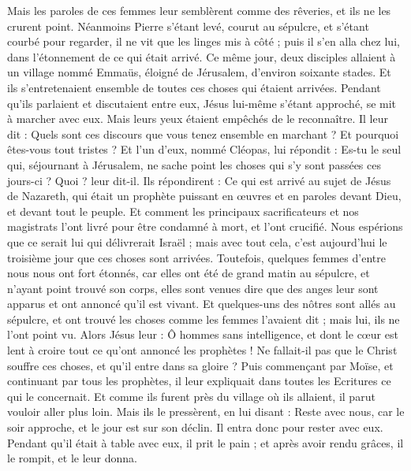 \begin{multicols}{2}
{Mais les paroles de ces femmes leur semblèrent comme des rêveries, et ils ne les crurent point.
Néanmoins Pierre s'étant levé, courut au sépulcre, et s'étant courbé pour regarder, il ne vit que les linges mis à côté ; puis il s’en alla chez lui, dans l’étonnement de ce qui était arrivé.
Ce même jour, deux disciples allaient à un village nommé Emmaüs, éloigné de Jérusalem, d’environ soixante stades.
Et ils s'entretenaient ensemble de toutes ces choses qui étaient arrivées.
Pendant qu’ils parlaient et discutaient entre eux, Jésus lui-même s'étant approché, se mit à marcher avec eux.
Mais leurs yeux étaient empêchés de le reconnaître.
Il leur dit : Quels sont ces discours que vous tenez ensemble en marchant ? Et pourquoi êtes-vous tout tristes ?
Et l'un d'eux, nommé Cléopas, lui répondit : Es-tu le seul qui, séjournant à Jérusalem, ne sache point les choses qui s’y sont passées ces jours-ci ?
Quoi ? leur dit-il. Ils répondirent : Ce qui est arrivé au sujet de Jésus de Nazareth, qui était un prophète puissant en œuvres et en paroles devant Dieu, et devant tout le peuple.
Et comment les principaux sacrificateurs et nos magistrats l'ont livré pour être condamné à mort, et l'ont crucifié.
Nous espérions que ce serait lui qui délivrerait Israël ; mais avec tout cela, c'est aujourd'hui le troisième jour que ces choses sont arrivées.
Toutefois, quelques femmes d'entre nous nous ont fort étonnés, car elles ont été de grand matin au sépulcre,
et n'ayant point trouvé son corps, elles sont venues dire que des anges leur sont apparus et ont annoncé qu’il est vivant.
Et quelques-uns des nôtres sont allés au sépulcre, et ont trouvé les choses comme les femmes l’avaient dit ; mais lui, ils ne l'ont point vu.
Alors Jésus leur : Ô hommes sans intelligence, et dont le cœur est lent à croire tout ce qu’ont annoncé les prophètes !
Ne fallait-il pas que le Christ souffre ces choses, et qu'il entre dans sa gloire ?
Puis commençant par Moïse, et continuant par tous les prophètes, il leur expliquait dans toutes les Ecritures ce qui le concernait.
Et comme ils furent près du village où ils allaient, il parut vouloir aller plus loin.
Mais ils le pressèrent, en lui disant : Reste avec nous, car le soir approche, et le jour est sur son déclin. Il entra donc pour rester avec eux.
Pendant qu’il était à table avec eux, il prit le pain ; et après avoir rendu grâces, il le rompit, et le leur donna.
}
\end{multicols}

